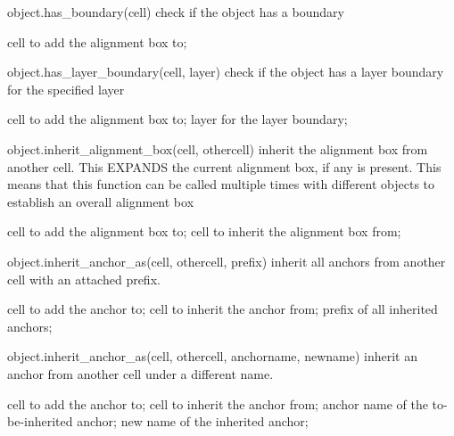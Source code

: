 \begin{APIfunc}{object.has\_boundary(cell)}
    check if the object has a boundary
    \begin{APIparameters}
            cell to add the alignment box to;
    \end{APIparameters}
\end{APIfunc}
\begin{APIfunc}{object.has\_layer\_boundary(cell, layer)}
    check if the object has a layer boundary for the specified layer
    \begin{APIparameters}
            cell to add the alignment box to;
            layer for the layer boundary;
    \end{APIparameters}
\end{APIfunc}
\begin{APIfunc}{object.inherit\_alignment\_box(cell, othercell)}
    inherit the alignment box from another cell. This EXPANDS the current alignment box, if any is present. This means that this function can be called multiple times with different objects to establish an overall alignment box
    \begin{APIparameters}
            cell to add the alignment box to;
            cell to inherit the alignment box from;
    \end{APIparameters}
\end{APIfunc}
\begin{APIfunc}{object.inherit\_anchor\_as(cell, othercell, prefix)}
    inherit all anchors from another cell with an attached prefix.
    \begin{APIparameters}
            cell to add the anchor to;
            cell to inherit the anchor from;
            prefix of all inherited anchors;
    \end{APIparameters}
\end{APIfunc}
\begin{APIfunc}{object.inherit\_anchor\_as(cell, othercell, anchorname, newname)}
    inherit an anchor from another cell under a different name.
    \begin{APIparameters}
            cell to add the anchor to;
            cell to inherit the anchor from;
            anchor name of the to-be-inherited anchor;
            new name of the inherited anchor;
    \end{APIparameters}
\end{APIfunc}
